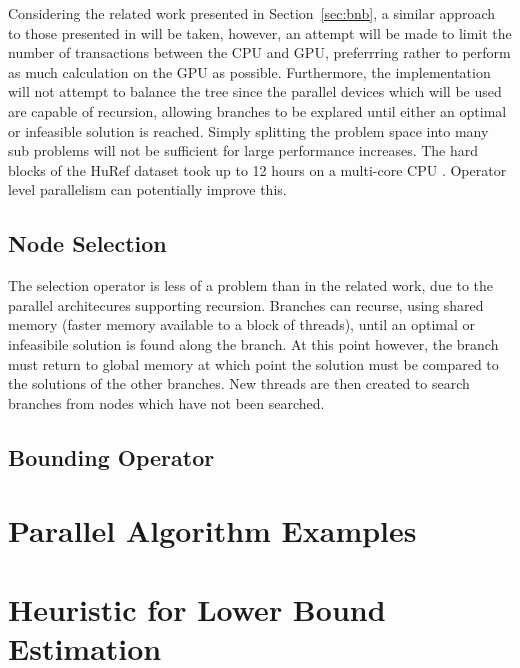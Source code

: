 \documentclass[10pt,twocolumn]{witseiepaper}
\begin{document}
Considering the related work presented in Section~\ref{sec:bnb}, a similar approach to those presented in
\cite{melab:2012, chakroun:2012, chakroun:2013} will be taken, however, an attempt will be made to limit the
number of transactions between the CPU and GPU, preferrring rather to perform as much calculation on the GPU
as possible. Furthermore, the implementation will not attempt to balance the tree since the parallel devices
which will be used are capable of recursion, allowing branches to be explared until either an optimal or
infeasible solution is reached. Simply splitting the problem space into many sub problems will not be
sufficient for large performance increases. The hard blocks of the HuRef dataset took up to 12 hours on a
multi-core CPU \cite{chen:2013}. Operator level parallelism can potentially improve this.

\subsection{Node Selection}

The selection operator is less of a problem than in the related work, due to the parallel architecures
supporting recursion. Branches can recurse, using shared memory (faster memory available to a block of
threads), until an optimal or infeasibile solution is found along the branch. At this point however, the 
branch must return to global memory at which point the solution must be compared to the solutions of the other
branches. New threads are then created to search branches from nodes which have not been searched.

\subsection{Bounding Operator}





\appendix

\clearpage 

\section{Parallel Algorithm Examples }

\section{Heuristic for Lower Bound Estimation}
\end{document}
